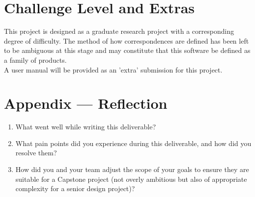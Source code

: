 \documentclass{article}
\begin{document}
\section{Challenge Level and Extras}
This project is designed as a graduate research project with a corresponding degree of difficulty. The method of how correspondences are defined has been left to be ambiguous at this stage and may constitute that this software be defined as a family of products.
\\A user manual will be provided as an 'extra' submission for this project.

\newpage{}

\section*{Appendix --- Reflection}




\begin{enumerate}
    \item What went well while writing this deliverable? 
    \item What pain points did you experience during this deliverable, and how
    did you resolve them?
    \item How did you and your team adjust the scope of your goals to ensure
    they are suitable for a Capstone project (not overly ambitious but also of
    appropriate complexity for a senior design project)?
\end{enumerate}  
\end{document}
